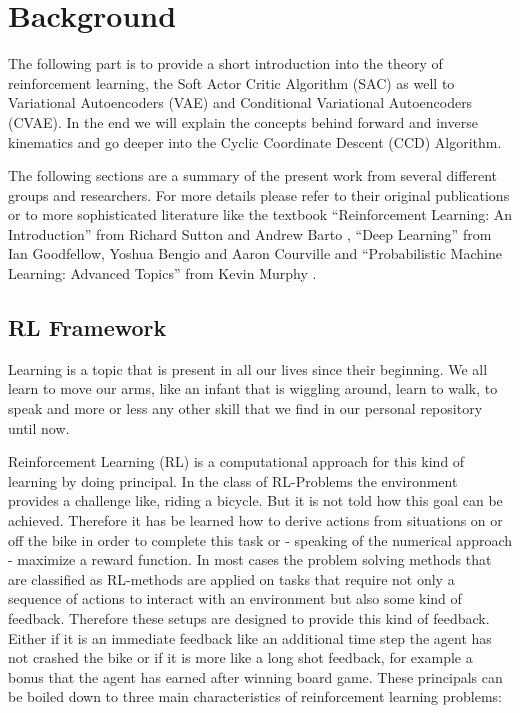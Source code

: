 \chapter{Background}\label{chap:background}

The following part is to provide a short introduction into the theory of reinforcement learning, the Soft Actor Critic Algorithm (SAC) as well to Variational Autoencoders (VAE) and Conditional Variational Autoencoders (CVAE). In the end we will explain the concepts behind forward and inverse kinematics and go deeper into the Cyclic Coordinate Descent (CCD) Algorithm.

The following sections are a summary of the present work from several different groups and researchers. For more details please refer to their original publications or to more sophisticated literature like the textbook ``Reinforcement Learning: An Introduction'' from Richard Sutton and Andrew Barto \cite{SuttonBartoRLBook}, ``Deep Learning'' from Ian Goodfellow, Yoshua Bengio and Aaron Courville \cite{DeepLearningTextBook} and ``Probabilistic Machine Learning: Advanced Topics'' from Kevin Murphy \cite{pml2Book}. 

\section{RL Framework}\label{sec:RL-Framework}

Learning is a topic that is present in all our lives since their beginning. We all learn to move our arms, like an infant that is wiggling around, learn to walk, to speak and more or less any other skill that we find in our personal repository until now.  

Reinforcement Learning (RL) is a computational approach for this kind of learning by doing principal.
In the class of RL-Problems the environment provides a challenge like, riding a bicycle. But it is not told how this goal can be achieved.  Therefore it has be learned how to derive actions from situations on or off the bike in order to complete this task or - speaking of the numerical approach - maximize a reward function.
In most cases the problem solving methods that are classified as RL-methods are applied on tasks that require not only a sequence of actions to interact with an environment but also some kind of feedback.
Therefore these setups are designed to provide this kind of feedback. Either if it is an immediate feedback like an additional time step the agent has not crashed the bike or if it is more like a long shot feedback, for example a bonus that the agent has earned after winning board game. 
These principals can be boiled down to three main characteristics of reinforcement learning problems:

